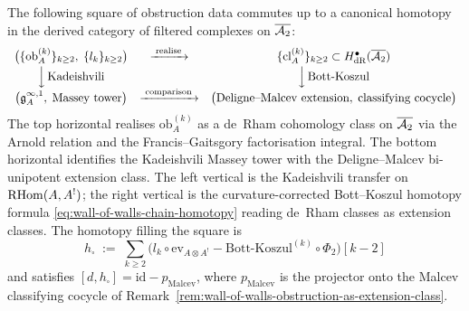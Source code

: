 \begin{theorem}
\label{thm:mc5-compatibility-square}
\ClaimStatusConditional{}%
The following square of obstruction data commutes up to a canonical
homotopy in the derived category of filtered complexes on
$\overline{\mathcal{A}_2}$:
\[
\begin{array}{ccc}
\bigl(\{\mathrm{ob}^{(k)}_A\}_{k\ge 2},\;\{l_k\}_{k\ge 2}\bigr)
 & \xrightarrow{\;\mathrm{realise}\;} &
 \{\mathrm{cl}^{(k)}_A\}_{k\ge 2}
 \subset H^\bullet_{\mathrm{dR}}(\overline{\mathcal{A}_2}) \\[2pt]
\Big\downarrow\,\mathrm{Kadeishvili} & &
\Big\downarrow\,\mathrm{Bott\text{-}Koszul} \\[2pt]
\bigl(\mathfrak{g}^{\infty,1}_A,\;\text{Massey tower}\bigr)
 & \xrightarrow{\;\mathrm{comparison}\;} &
 \bigl(\text{Deligne--Malcev extension},\;
 \text{classifying cocycle}\bigr)
\end{array}
\]
The top horizontal realises $\mathrm{ob}^{(k)}_A$ as a de~Rham
cohomology class on $\overline{\mathcal{A}_2}$ via the Arnold relation and the
Francis--Gaitsgory factorisation integral. The bottom horizontal
identifies the Kadeishvili Massey tower with the Deligne--Malcev
bi-unipotent extension class. The left vertical is the Kadeishvili
transfer on $\mathrm{RHom}(A,A^!)$; the right vertical is the
curvature-corrected Bott--Koszul homotopy formula
\textup{\eqref{eq:wall-of-walls-chain-homotopy}} reading de~Rham
classes as extension classes. The homotopy filling the square is
\[
h_\square \;:=\;
\sum_{k\ge 2}
 \bigl(l_k\circ\mathrm{ev}_{A\otimes A^!}
 -\mathrm{Bott\text{-}Koszul}^{(k)}\circ\Phi_2\bigr)[k-2]
\]
and satisfies $[d,h_\square] = \mathrm{id}-p_{\mathrm{Malcev}}$,
where $p_{\mathrm{Malcev}}$ is the projector onto the Malcev
classifying cocycle of
Remark~\textup{\ref{rem:wall-of-walls-obstruction-as-extension-class}}.
\end{theorem}

